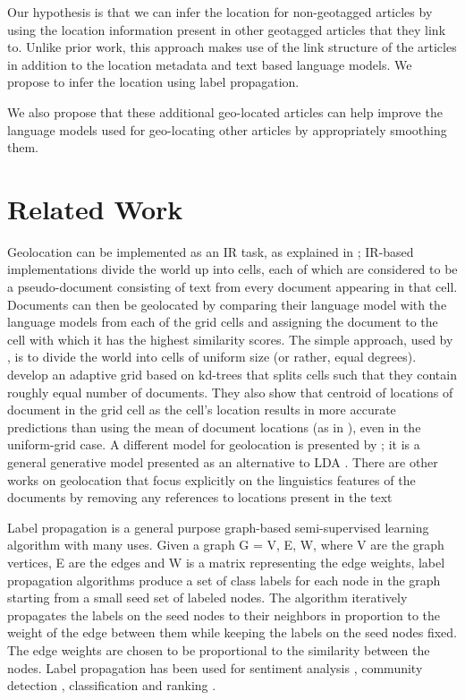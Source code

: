 \documentclass[11pt]{article}
\newcommand{\comment}[1]{}
\begin{document}
Our hypothesis is that we can infer the location for non-geotagged articles by using the location information present in other geotagged articles that they link to. 
Unlike prior work, this approach makes use of the link structure of the articles in addition to the location metadata and text based language models. 
We propose to infer the location using label propagation.

We also propose that these additional geo-located articles can help improve the language models used for geo-locating other articles by appropriately smoothing them.

\section{Related Work}
Geolocation can be implemented as an IR task, as explained in \cite{skiles:12}; 
IR-based implementations divide the world up into cells, each of which are considered to be a pseudo-document consisting of text from every document appearing in that cell.
Documents can then be geolocated by comparing their language model with the language models from each of the grid cells and assigning the document to the cell with which
it has the highest similarity scores.
The simple approach, used by \cite{wing-baldridge:11}, is to divide the world into cells of uniform size (or rather, equal degrees).
\cite{rolleretal:12} develop an adaptive grid based on kd-trees that splits cells such that they contain roughly equal number of documents.
They also show that centroid of locations of document in the grid cell as the cell's location results in more accurate predictions than using the mean of document locations (as in
\cite{wing-baldridge:11}), even in the uniform-grid case. A different model for geolocation is presented by \cite{eisensteinetal:11}; it
is a general generative model presented as an alternative to LDA \comment{who uses LDA?}. There are other works on geolocation that focus
explicitly on the linguistics features of the documents by removing any references to locations present in the text \cite{paper}

Label propagation is a general purpose graph-based semi-supervised learning algorithm \cite{talukdar:09} \cite{talukdar:10} with many uses. 
Given a graph G = {V, E, W}, where V are the graph vertices, E are the edges and W is a matrix representing the edge weights, 
label propagation algorithms produce a set of class labels for each node in the graph starting from a small seed set of labeled nodes. 
The algorithm iteratively propagates the labels on the seed nodes to their neighbors in proportion to the weight of the edge between them 
while keeping the labels on the seed nodes fixed. The edge weights are chosen to be proportional to the similarity between the nodes. 
Label propagation has been used for sentiment analysis \cite{sperisou}, community detection \cite{talukdar}, 
classification and ranking \cite{something} \comment{and recommendation, youtube}. 
\end{document}
